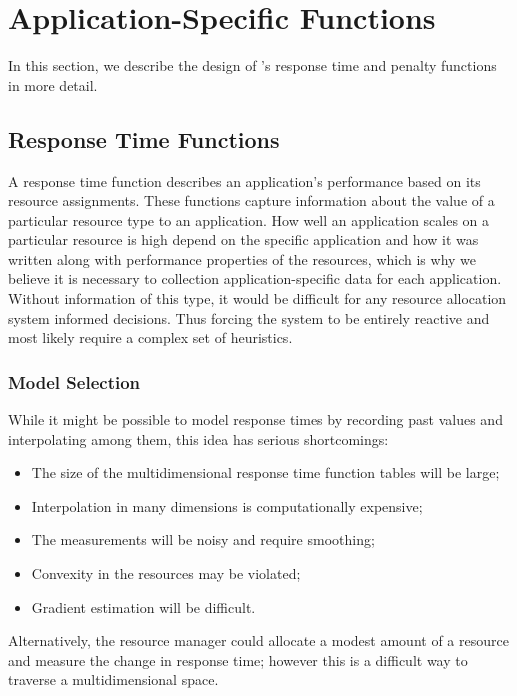 \section{Application-Specific Functions}\label{app_func}


In this section, we describe the design of \pacora's response time and penalty functions in more detail.

\subsection*{Response Time Functions}

A response time function describes an application's performance based on its resource assignments.  These functions capture information about the value of a particular resource type to an application.  How well an application scales on a particular resource is high depend on the specific application and how it was written along with performance properties of the resources, which is why we believe it is necessary to collection application-specific data for each application. Without information of this type, it would be difficult for any resource allocation system informed decisions.  Thus forcing the system to be entirely reactive and most likely require a complex set of heuristics.

\subsubsection*{Model Selection} While it might be possible to model response times by recording past values and interpolating among them, this idea has serious shortcomings:
\begin{itemize}
\item The size of the multidimensional response time function tables will be large;
\item Interpolation in many dimensions is computationally expensive;
\item The measurements will be noisy and require smoothing;
\item Convexity in the resources may be violated;
\item Gradient estimation will be difficult.
\end{itemize}
Alternatively, the resource manager could allocate a modest amount of a resource and measure the change in response time; however this is a difficult way to traverse a multidimensional space.


